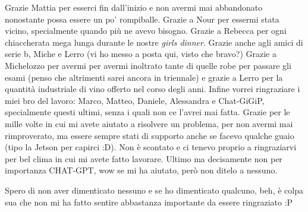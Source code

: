 Grazie Mattia per esserci fin dall'inizio e non avermi mai abbandonato nonostante possa essere un po' rompiballe.
Grazie a Nour per essermi stata vicino, specialmente quando più ne avevo bisogno.
Grazie a Rebecca per ogni chiaccherata mega lunga durante le nostre \emph{girls dinner}.
Grazie anche agli amici di serie b, Miche e Lerro (vi ho messo a posta qui, visto che bravo?)
Grazie a Michelozzo per avermi per avermi inoltrato tante di quelle robe per passare gli esami (penso che altrimenti sarei ancora in triennale) e grazie a Lerro per la quantità industriale di vino offerto nel corso degli anni.
Infine vorrei ringraziare i miei bro del lavoro: Marco, Matteo, Daniele, Alessandra e Chat-GiGiP, specialmente questi ultimi, senza i quali non ce l'avrei mai fatta. Grazie per le mille volte in cui mi avete aiutato a risolvere un problema, per non avermi mai rimproverato, ma essere sempre stati di supporto anche se facevo qualche guaio (tipo la Jetson per capirci :D).
Non è scontato e ci tenevo proprio a ringraziarvi per bel clima in cui mi avete fatto lavorare.
Ultimo ma decisamente non per importanza CHAT-GPT, wow se mi ha aiutato, però non ditelo a nessuno.


Spero di non aver dimenticato nessuno e se ho dimenticato qualcuno, beh, è colpa sua che non mi ha fatto sentire abbastanza importante da essere ringraziato :P

\vfill
